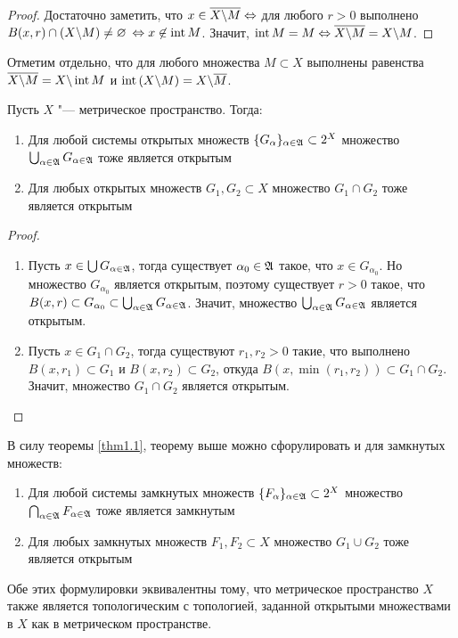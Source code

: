 \begin{proof}
	Достаточно заметить, что $x \in \overline{X \backslash M} \Leftrightarrow$ для любого $r > 0$ выполнено $B(x, r) \cap (X \backslash M) \ne \varnothing$ $\Leftrightarrow x \not\in \operatorname{int}{M}$. Значит, $\operatorname{int} M = M\Leftrightarrow \overline{X \backslash M} = X \backslash M$.
\end{proof}

\begin{note}
	Отметим отдельно, что для любого множества $M \subset X$ выполнены равенства $\overline{X \backslash M} = X \backslash \operatorname{int} M$ и $\operatorname{int}{(X \backslash M)} = X \backslash \overline M$.
\end{note}

\begin{theorem}\label{thm1.2}
	Пусть $X$ "--- метрическое пространство. Тогда:
	\begin{enumerate}
		\item Для любой системы открытых множеств $\{G_\alpha\}_{\alpha \in \mathfrak A} \subset 2^X$ множество $\bigcup_{\alpha \in \mathfrak A} G_{\alpha \in \mathfrak A}$ тоже является открытым

		\item Для любых открытых множеств $G_1, G_2 \subset X$ множество $G_1 \cap G_2$ тоже является открытым
	\end{enumerate}
\end{theorem}

\begin{proof}~
	\begin{enumerate}
		\item Пусть $x \in \bigcup G_{\alpha \in \mathfrak A}$, тогда существует $\alpha_0 \in \mathfrak A$ такое, что $x \in G_{\alpha_0}$. Но множество $G_{\alpha_0}$ является открытым, поэтому существует $r > 0$ такое, что $B(x, r) \subset G_{\alpha_0} \subset \bigcup_{\alpha \in \mathfrak A} G_{\alpha \in \mathfrak A}$. Значит, множество $\bigcup_{\alpha \in \mathfrak A} G_{\alpha \in \mathfrak A}$ является открытым.

		\item Пусть $x \in G_1 \cap G_2$, тогда существуют $r_1, r_2 > 0$ такие, что выполнено $B(x, r_1) \subset G_1$ и $B(x, r_2) \subset G_2$, откуда $B(x, \min(r_1, r_2)) \subset G_1 \cap G_2$. Значит, множество $G_1 \cap G_2$ является открытым.\qedhere
	\end{enumerate}
\end{proof}

\begin{note}
	В силу теоремы \ref{thm1.1}, теорему выше можно сфорулировать и для замкнутых множеств:
	\begin{enumerate}
		\item Для любой системы замкнутых множеств $\{F_\alpha\}_{\alpha \in \mathfrak A} \subset 2^X$ множество $\bigcap_{\alpha \in \mathfrak A} F_{\alpha \in \mathfrak A}$ тоже является замкнутым

		\item Для любых замкнутых множеств $F_1, F_2 \subset X$ множество $G_1 \cup G_2$ тоже является открытым
	\end{enumerate}

	Обе этих формулировки эквивалентны тому, что метрическое пространство $X$ также является топологическим с топологией, заданной открытыми множествами в $X$ как в метрическом пространстве.
\end{note}


